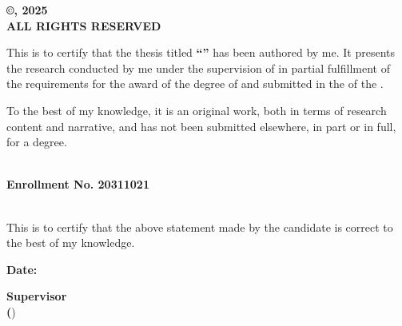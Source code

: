\documentclass[11pt, a4paper, twoside]{Thesis} %
\begin{document}
\thispagestyle{empty} %
\hspace{0pt}
\vfill 
\begin{center}
    \textbf{\copyright \UNIVNAME, 2025\\ALL RIGHTS RESERVED}
\end{center}
\vfill 
\hspace{0pt}

\clearpage 




This is to certify that the thesis titled \textbf{``\ttitle''} has been authored by me. It presents the research conducted by me under the supervision of \textbf{\supnameA} in partial fulfillment of the requirements for the award of the degree of \textbf{\degreename} and submitted in the \textbf{\deptname} of the \textbf{\univname}.\par

To the best of my knowledge, it is an original work, both in terms of research content and narrative, and has not been submitted elsewhere, in part or in full, for a degree.\\ [2cm]
\begin{minipage}{\textwidth}
		\begin{flushright}
            {\textbf{\authornames}\\ \textbf{Enrollment No. 20311021}\\
                \normalsize{\href{https://ph.iitr.ac.in/}{\textbf{\deptname}}\\
            \textbf{\univname}}}
		\end{flushright}
\end{minipage}

\vfill
This is to certify that the above statement made by the candidate is correct to the best of my knowledge.\\[1cm]

\begin{minipage}{0.39\textwidth}
		\begin{flushleft}
            {\textbf{Date:}}
		\end{flushleft}
\end{minipage}
\begin{minipage}{0.59\textwidth}
		\begin{flushright}
            {\textbf{Supervisor\\(\supnameA})} 
		\end{flushright}
\end{minipage}
\end{document}
